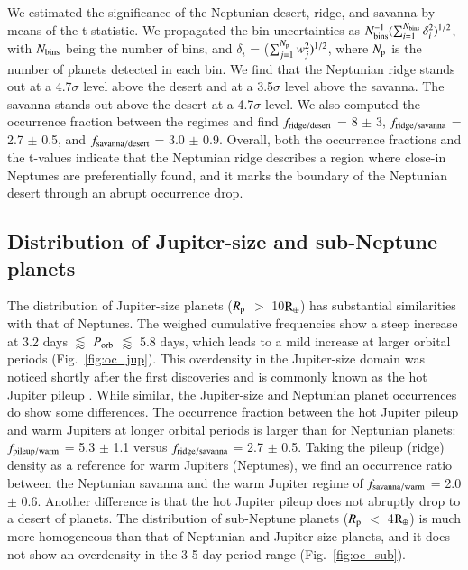 \documentclass[]{aa}
\begin{document}
We estimated the significance of the Neptunian desert, ridge, and savanna by means of the t-statistic. We propagated the bin uncertainties as $N_{\rm bins}^{-1} (\sum_{i = 1}^{N_{\rm bins}} \delta_{i}^{2})^{1/2}$, with $N_{\rm bins}$ being the number of bins, and $\delta_{i}$ = ($\sum_{j = 1}^{N_{\rm p}} w_{j}^{2})^{1/2}$, where $N_{\rm p}$ is the number of planets detected in each bin. We find that the Neptunian ridge stands out at a 4.7$\sigma$ level above the desert and at a 3.5$\sigma$ level above the savanna. The savanna stands out above the desert at a 4.7$\sigma$ level. We also computed the occurrence fraction between the regimes and find $f_{\rm ridge/desert}$ = 8 $\pm$ 3, $f_{\rm ridge/savanna}$ = 2.7 $\pm$ 0.5, and $f_{\rm savanna/desert}$ = 3.0 $\pm$ 0.9. Overall, both the occurrence fractions and the t-values indicate that the Neptunian ridge describes a region where close-in Neptunes are preferentially found, and it marks the boundary of the Neptunian desert through an abrupt occurrence drop.
\subsection{Distribution of Jupiter-size and sub-Neptune planets}
\label{sec:oc_giant_small}

The distribution of Jupiter-size planets ($R_{\rm p}$ $>$ 10$\rm R_{\oplus}$) has substantial similarities with that of Neptunes. The weighed cumulative frequencies show a steep increase at 3.2 days $\lessapprox$ $P_{\rm orb}$ $\lessapprox$ 5.8 days, which leads to a mild increase at larger orbital periods (Fig.~\ref{fig:oc_jup}). This overdensity in the Jupiter-size domain was noticed shortly after the first discoveries and is commonly known as the hot Jupiter pileup \citep[e.g][]{2007ARA&A..45..397U,2009ApJ...693.1084W}. While similar, the Jupiter-size and Neptunian planet occurrences do show some differences. The occurrence fraction between the hot Jupiter pileup and warm Jupiters at longer orbital periods is larger than for Neptunian planets: $f_{\rm pileup/warm}$ = 5.3 $\pm$ 1.1 versus $f_{\rm ridge/savanna}$ = 2.7 $\pm$ 0.5. Taking the pileup (ridge) density as a reference for warm Jupiters (Neptunes), we find an occurrence ratio between the Neptunian savanna and the warm Jupiter regime of $f_{\rm savanna/warm}$ = 2.0 $\pm$ 0.6.  Another difference is that the hot Jupiter pileup does not abruptly drop to a desert of planets. The distribution of sub-Neptune planets ($R_{\rm p}$ $<$ 4$\rm R_{\oplus}$) is much more homogeneous than that of Neptunian and Jupiter-size planets, and it does not show an overdensity in the 3-5 day period range (Fig.~\ref{fig:oc_sub}).
\end{document}
